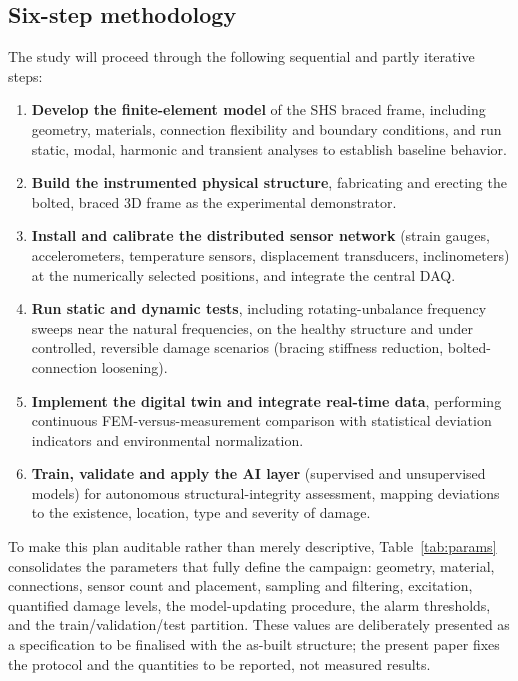 \subsection{Six-step methodology}\label{subsec:sixstep}

The study will proceed through the following sequential and partly iterative steps:

\begin{enumerate}
    \item \textbf{Develop the finite-element model} of the SHS braced frame, including geometry, materials, connection flexibility and boundary conditions, and run static, modal, harmonic and transient analyses to establish baseline behavior.
    \item \textbf{Build the instrumented physical structure}, fabricating and erecting the bolted, braced 3D frame as the experimental demonstrator.
    \item \textbf{Install and calibrate the distributed sensor network} (strain gauges, accelerometers, temperature sensors, displacement transducers, inclinometers) at the numerically selected positions, and integrate the central DAQ.
    \item \textbf{Run static and dynamic tests}, including rotating-unbalance frequency sweeps near the natural frequencies, on the healthy structure and under controlled, reversible damage scenarios (bracing stiffness reduction, bolted-connection loosening).
    \item \textbf{Implement the digital twin and integrate real-time data}, performing continuous FEM-versus-measurement comparison with statistical deviation indicators and environmental normalization.
    \item \textbf{Train, validate and apply the AI layer} (supervised and unsupervised models) for autonomous structural-integrity assessment, mapping deviations to the existence, location, type and severity of damage.
\end{enumerate}

To make this plan auditable rather than merely descriptive, Table~\ref{tab:params} consolidates the parameters that fully define the campaign: geometry, material, connections, sensor count and placement, sampling and filtering, excitation, quantified damage levels, the model-updating procedure, the alarm thresholds, and the train/validation/test partition. These values are deliberately presented as a specification to be finalised with the as-built structure; the present paper fixes the protocol and the quantities to be reported, not measured results.
